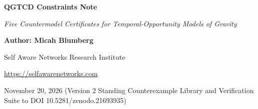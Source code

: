 \documentclass[
  american,
  11pt,
  letterpaper,
]{article}
\author{}
\date{}
\begin{document}
\begin{center}

{\LARGE\bfseries QGTCD Constraints Note\par}

\vspace{0.35em}

{\large\itshape Five Countermodel Certificates for Temporal-Opportunity Models of Gravity\par}

\vspace{0.8em}

{\small\textbf{Author: Micah Blumberg}\par}

{\small Self Aware Networks Research Institute\par}

{\small\url{https://selfawarenetworks.com}\par}

{\small November 20, 2026 (Version 2 Standing Counterexample Library and Verification Suite to DOI 10.5281/zenodo.21693935)\par}

\end{center}

\vspace{0.65em}
\end{document}
